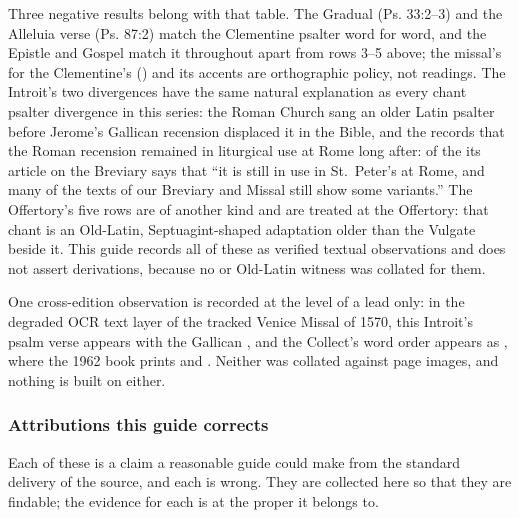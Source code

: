 Three negative results belong with that table. The Gradual (Ps. 33:2--3) and
the Alleluia verse (Ps. 87:2) match the Clementine psalter word for word, and
the Epistle and Gospel match it throughout apart from rows 3--5 above; the
missal's  for the Clementine's  () and its accents are orthographic policy, not readings. The
Introit's two divergences have the same natural explanation as every chant
psalter divergence in this series: the Roman Church sang an older Latin
psalter before Jerome's Gallican recension displaced it in the Bible, and the
 records that the Roman recension remained in
liturgical use at Rome long after: of the  its
article on the Breviary says that ``it is still in use in St.\ Peter's at
Rome, and many of the texts of our Breviary and Missal still show some
variants.'' The Offertory's five rows are of another
kind and are treated at the Offertory: that chant is an Old-Latin,
Septuagint-shaped adaptation older than the Vulgate beside it. This guide
records all of these as verified textual observations and does not assert
derivations, because no  or Old-Latin witness was
collated for them.

One cross-edition observation is recorded at the level of a lead only: in the
degraded OCR text layer of the tracked Venice Missal of 1570, this Introit's
psalm verse appears with the Gallican , and the
Collect's word order appears as , where the 1962
book prints  and . Neither was collated against page images, and nothing is built on
either.

\subsubsection*{Attributions this guide corrects}

Each of these is a claim a reasonable guide could make from the standard
delivery of the source, and each is wrong. They are collected here so that
they are findable; the evidence for each is at the proper it belongs to.

